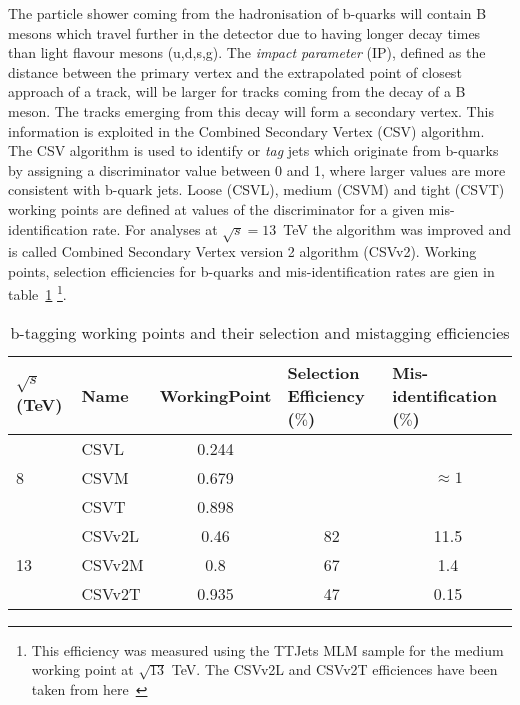 The particle shower coming from the hadronisation of b-quarks will contain B mesons which travel further in the detector due to having longer decay times than light flavour mesons (u,d,s,g). The \emph{impact parameter} (IP), defined as the distance between the primary vertex and the extrapolated point of closest approach of a track, will be larger for tracks coming from the decay of a B meson. The tracks emerging from this decay will form a secondary vertex. This information is exploited in the Combined Secondary Vertex (CSV) algorithm. The CSV algorithm is used to identify or \emph{tag} jets which originate from b-quarks by assigning a discriminator value between 0 and 1, where larger values are more consistent with b-quark jets. Loose (CSVL), medium (CSVM) and tight (CSVT) working points are defined at values of the discriminator for a given mis-identification rate. For analyses at $\sqrt{s} = 13$~TeV the algorithm was improved and is called Combined Secondary Vertex version 2 algorithm (CSVv2). Working points, selection efficiencies for b-quarks and mis-identification rates are gien in table~\ref{tab:btag} \footnote{This efficiency was measured using the TTJets MLM sample for the medium working point at $\sqrt{13}$ TeV. The CSVv2L and CSVv2T efficiences have been taken from here~\cite{btageff} }.

\begin{table}[htpb!]
\footnotesize
\begin{center}
\begin{tabular}{l|l|c|c|c}
$\sqrt{s}$ (TeV)    & Name   & \multicolumn{1}{l|}{WorkingPoint} & \multicolumn{1}{l|}{Selection Efficiency ($\%$)} & \multicolumn{1}{l}{Mis-identification ($\%$)} \\ \hline
\multirow{3}{*}{8}  & CSVL   & 0.244                             &                                                  &                                               \\ \cline{2-5} 
                    & CSVM   & 0.679                             &                                                  & $\approx 1$                                   \\ \cline{2-5} 
                    & CSVT   & 0.898                             &                                                  &                                               \\ \hline
\multirow{3}{*}{13} & CSVv2L & 0.46                              & 82                                               & 11.5                                          \\ \cline{2-5} 
                    & CSVv2M & 0.8                               & 67                                               & 1.4                                           \\ \cline{2-5} 
                    & CSVv2T & 0.935                             & 47                                               & 0.15                                         
\end{tabular}
\caption{b-tagging working points and their selection and mistagging efficiencies}
\label{tab:btag}
\end{center}
\end{table}

